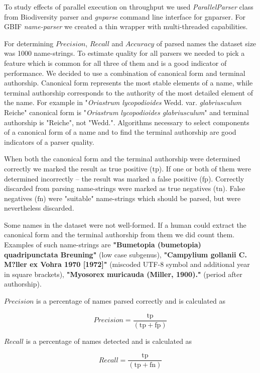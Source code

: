 \documentclass{bmcart}
\begin{document}
To study effects of parallel execution on throughput we used
\textit{ParallelParser} class from Biodiversity parser and \textit{gnparse}
command line interface for gnparser. For GBIF \textit{name-parser} we created a
thin wrapper with multi-threaded capabilities\cite{gbifparser}.

For determining $Precision$, $Recall$ and $Accuracy$ of parsed names the
dataset size was 1000 name-strings. To estimate quality for all parsers we
needed to pick a feature which is common for all three of them and is a good
indicator of performance.  We decided to use a combination of canonical form
and terminal authorship.  Canonical form represents the most stable elements
of a name, while terminal authorship corresponds to the authority of the most
detailed element of the name. For example in "\textit{Oriastrum lycopodioides}
Wedd.  var.  \textit{glabriusculum} Reiche" canonical form is
"\textit{Oriastrum lycopodioides glabriusculum}" and terminal authorship is
"Reiche", not "Wedd.".  Algorithms necessary to select components of a
canonical form of a name and to find the terminal authorship are good
indicators of a parser quality.

When both the canonical form and the terminal authorship were determined
correctly we marked the result as true positive ($\text{tp}$).  If one or both
of them were determined incorrectly -- the result was marked a false positive
($\text{fp}$). Correctly discarded from parsing name-strings were marked as
true negatives ($\text{tn}$). False negatives ($\text{fn}$) were "suitable"
name-strings which should be parsed, but were nevertheless discarded.

Some names in the dataset were not well-formed. If a human could extract the
canonical form and the terminal authorship from them we did count them.
Examples of such name-strings are \textbf{"Bumetopia (bumetopia)
quadripunctata Breuning"} (low case subgenus), \textbf{"Campylium gollanii C.
M?ller ex Vohra 1970 [1972]"} (miscoded UTF-8 symbol and additional year in
square brackets), \textbf{"Myosorex muricauda (Miller, 1900)."} (period after
authorship).

$Precision$ is a percentage of names parsed correctly and is calculated as

\[Precision = \dfrac{\text{tp}}{(\text{tp} + \text{fp})}\]

$Recall$ is a percentage of names detected and is calculated as

\[Recall = \dfrac{\text{tp}}{(\text{tp} + \text{fn})}\]
\end{document}
